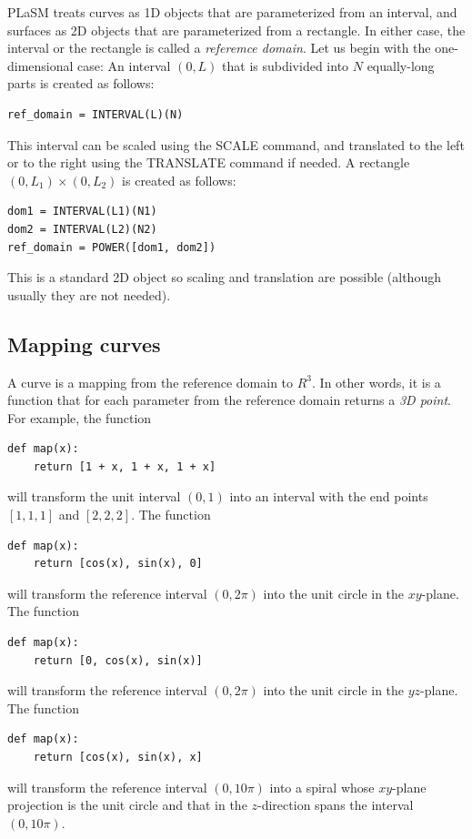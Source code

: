 \documentclass[article,A4,12pt]{llncs}
\begin{document}
PLaSM treats curves as 1D objects that are parameterized from an interval,
and surfaces as 2D objects that are parameterized from a rectangle. In either
case, the interval or the rectangle is called a {\em referemce domain}. Let 
us begin with the one-dimensional case: An interval $(0, L)$ that is subdivided 
into $N$ equally-long parts is created as follows:

\begin{verbatim}
ref_domain = INTERVAL(L)(N)
\end{verbatim}
This interval can be scaled using the SCALE command, and translated to the left or to the 
right using the TRANSLATE command if needed. A rectangle $(0, L_1) \times (0, L_2)$ is 
created as follows:

\begin{verbatim}
dom1 = INTERVAL(L1)(N1)
dom2 = INTERVAL(L2)(N2)
ref_domain = POWER([dom1, dom2])
\end{verbatim}
This is a standard 2D object so scaling and translation are possible (although usually
they are not needed).

\subsection{Mapping curves}

A curve is a mapping from the reference domain to $R^3$. In other words,
it is a function that for each parameter from the reference domain returns a {\em 3D point}.
For example, the function 

\begin{verbatim}
def map(x):
    return [1 + x, 1 + x, 1 + x]
\end{verbatim}
will transform the unit interval $(0, 1)$ into an interval with the end points 
$[1, 1, 1]$ and $[2, 2, 2]$. The function 

\begin{verbatim}
def map(x):
    return [cos(x), sin(x), 0]
\end{verbatim}
will transform the reference interval $(0, 2\pi)$ into the unit circle in the 
$xy$-plane. The function 

\begin{verbatim}
def map(x):
    return [0, cos(x), sin(x)]
\end{verbatim}
will transform the reference interval $(0, 2\pi)$ into the unit circle in the 
$yz$-plane. The function 

\begin{verbatim}
def map(x):
    return [cos(x), sin(x), x]
\end{verbatim}
will transform the reference interval $(0, 10\pi)$ into a spiral whose 
$xy$-plane projection is the unit circle and that in the $z$-direction spans 
the interval $(0, 10\pi)$.
\end{document}
